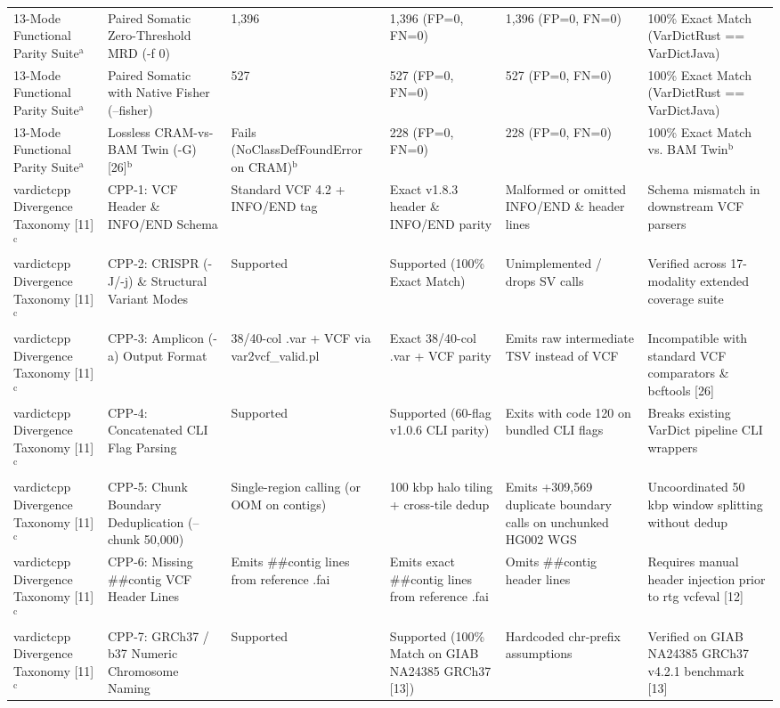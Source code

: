 \begin{table}[htbp]
{\begin{tabular}{llllll}
13-Mode Functional Parity Suite$^{\text{a}}$ & Paired Somatic Zero-Threshold MRD (-f 0) & 1,396 & 1,396 (FP=0, FN=0) & 1,396 (FP=0, FN=0) & 100\% Exact Match (VarDictRust == VarDictJava) \\
13-Mode Functional Parity Suite$^{\text{a}}$ & Paired Somatic with Native Fisher (--fisher) & 527 & 527 (FP=0, FN=0) & 527 (FP=0, FN=0) & 100\% Exact Match (VarDictRust == VarDictJava) \\
13-Mode Functional Parity Suite$^{\text{a}}$ & Lossless CRAM-vs-BAM Twin (-G) [26]$^{\text{b}}$ & Fails (NoClassDefFoundError on CRAM)$^{\text{b}}$ & 228 (FP=0, FN=0) & 228 (FP=0, FN=0) & 100\% Exact Match vs. BAM Twin$^{\text{b}}$ \\
vardictcpp Divergence Taxonomy [11]$^{\text{c}}$ & CPP-1: VCF Header \& INFO/END Schema & Standard VCF 4.2 + INFO/END tag & Exact v1.8.3 header \& INFO/END parity & Malformed or omitted INFO/END \& header lines & Schema mismatch in downstream VCF parsers \\
vardictcpp Divergence Taxonomy [11]$^{\text{c}}$ & CPP-2: CRISPR (-J/-j) \& Structural Variant Modes & Supported & Supported (100\% Exact Match) & Unimplemented / drops SV calls & Verified across 17-modality extended coverage suite \\
vardictcpp Divergence Taxonomy [11]$^{\text{c}}$ & CPP-3: Amplicon (-a) Output Format & 38/40-col .var + VCF via var2vcf\_valid.pl & Exact 38/40-col .var + VCF parity & Emits raw intermediate TSV instead of VCF & Incompatible with standard VCF comparators \& bcftools [26] \\
vardictcpp Divergence Taxonomy [11]$^{\text{c}}$ & CPP-4: Concatenated CLI Flag Parsing & Supported & Supported (60-flag v1.0.6 CLI parity) & Exits with code 120 on bundled CLI flags & Breaks existing VarDict pipeline CLI wrappers \\
vardictcpp Divergence Taxonomy [11]$^{\text{c}}$ & CPP-5: Chunk Boundary Deduplication (--chunk 50,000) & Single-region calling (or OOM on contigs) & 100 kbp halo tiling + cross-tile dedup & Emits +309,569 duplicate boundary calls on unchunked HG002 WGS & Uncoordinated 50 kbp window splitting without dedup \\
vardictcpp Divergence Taxonomy [11]$^{\text{c}}$ & CPP-6: Missing \#\#contig VCF Header Lines & Emits \#\#contig lines from reference .fai & Emits exact \#\#contig lines from reference .fai & Omits \#\#contig header lines & Requires manual header injection prior to rtg vcfeval [12] \\
vardictcpp Divergence Taxonomy [11]$^{\text{c}}$ & CPP-7: GRCh37 / b37 Numeric Chromosome Naming & Supported & Supported (100\% Match on GIAB NA24385 GRCh37 [13]) & Hardcoded chr-prefix assumptions & Verified on GIAB NA24385 GRCh37 v4.2.1 benchmark [13] \\

\end{tabular}}
\end{table}
